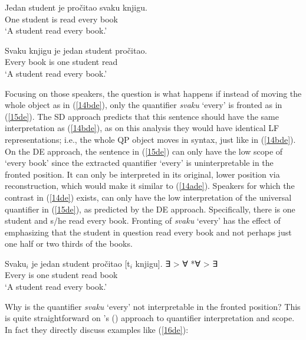 \documentclass[output=paper]{langscibook}
\begin{document}
\begin{exe}
\ex \label{14de}
\begin{xlist}
\ex \label{14ade}
\gll Jedan student je pročitao svaku knjigu.\\
One student is read every book\\
\glt ‘A student read every book.’ 


\ex \label{14bde}
\gll Svaku knjigu je jedan student pročitao.\\
Every book is one student read\\
\glt ‘A student read every book.’ 

\end{xlist}
\end{exe}

Focusing on those speakers, the question is what happens if instead of moving the whole object as in (\ref{14bde}), only the quantifier \textit{svaku} ‘every’ is fronted as in (\ref{15de}). The SD approach predicts that this sentence should have the same interpretation as (\ref{14bde}), as on this analysis they would have identical LF representations; i.e., the whole QP object moves in syntax, just like in (\ref{14bde}). On the DE approach, the sentence in (\ref{15de}) can only have the low scope of ‘every book’ since the extracted quantifier ‘every’ is uninterpretable in the fronted position. It can only be interpreted in its original, lower position via reconstruction, which would make it similar to (\ref{14ade}). Speakers for which the contrast in (\ref{14de}) exists, can only have the low interpretation of the universal quantifier in (\ref{15de}), as predicted by the DE approach. Specifically, there is one student and s/he read every book. Fronting of \textit{svaku} ‘every’ has the effect of emphasizing that the student in question read every book and not perhaps just one half or two thirds of the books. 

\begin{exe}
\ex \label{15de}
\gll Svaku$_{i}$ je jedan student pročitao [t$_{i}$ knjigu]. \hspace{14mm} \cmark ∃ > ∀ *∀ > ∃\\
Every is one student read {} book\\
\glt ‘A student read every book.’ 
\end{exe}

Why is the quantifier \textit{svaku} ‘every’ not interpretable in the fronted position? This is quite straightforward on \citeauthor{HeimKratzer1998}’s (\citeyear{HeimKratzer1998}) approach to quantifier interpretation and scope.  In fact they directly discuss examples like (\ref{16de}):
\end{document}
